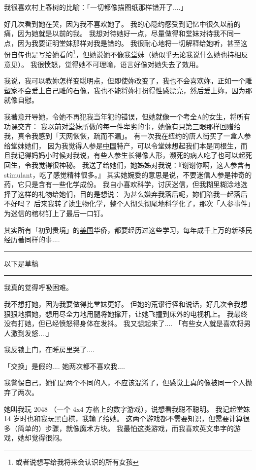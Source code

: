 \documentclass[12pt]{report}
\newcommand*\todo{\begin{center}\color{red}  \rule{5cm}{0.5pt} 以下是草稿\, \rule{5cm}{0.5pt} \end{center}}
\begin{document}
我很喜欢村上春树的比喻：「一切都像描图纸那样错开了....」

好几次看到她在哭，因为我不喜欢她了。  我的心隐约感受到记忆中很久以前的痛，因为她就是以前的我。 我想对待她好一点，尽量做得和堂妹对待我不同一点，因为我要证明堂妹那样对我是错的。 我很耐心地将一切解释给她听，甚至这份自传也是写给她看的\footnote{或者说想写给我将来会认识的所有女孩}，但她说她不像我堂妹（她似乎无论我说什么她也持相反意见）。 我很愤怒，觉得她不可理喻，语言好像对她失去了效用。

我说，我可以教妳怎样变聪明点，但即使妳改变了，我也不会喜欢妳，正如一个雕塑家不会爱上自己雕的石像，我也不能将妳打扮得性感漂亮，然后爱上妳，因为那就像自慰。

我著意开导她，令她不再犯我当年犯的错误，但她就像一个考全A的女生，将所有功课交齐： 我以前对堂妹所做的每一件卑劣的事，她像有只第三眼那样回赠给我，真令我感到「天网恢恢，疏而不漏」。 有一次我在纽约的唐人街买了一盒人参给堂妹她们， 因为我觉得人参是\underline{中国}特产，可以令堂妹想起我们本是同根生，而且我记得妈妈小时候对我说，有些人参生长得像人形，濒死的病人吃了也可以起死回生，令我觉得很神秘。 我送了给她们，她姊姊对我说：『谢谢你啊，这人参含有 stimulant，吃了感觉精神很多。』  其实她婉委的意思是说，不要迷信人参是神奇的药，它只是含有一些化学成份。 我自小喜欢科学，讨厌迷信，但我糊里糊涂地选择了这样的礼物给她们，目的是想说： 为甚么嫌弃我落后呢，妳们陪我一起落后不好吗？ 后来我转了读生物化学，整个人彻头彻尾地科学化了，那次「人参事件」为迷信的棺材钉上了最后一口钉。

其实所有「初到贵境」的\underline{美国}华侨，都要经历过这些学习，每年成千上万的新移民经历著同样的事....

\todo

我真的觉得呼吸困难。

我不想打她，因为我要做得比堂妹更好。  但她的荒谬行径和说话，好几次令我想狠狠地掴她，想用尽全力地用腿将她撑开，让她飞撞到床外的电视机上。  我最终没有打她，但已经愤怒得身体在发抖。  我又想起来了.... 「有些女人就是喜欢将男人激到发怒....」

我反锁上门，在睡房里哭了....

「交换」是假的.... 她两次都不喜欢我....

我警惕自己，她们是两个不同的人，不应该混淆了，但感觉上真的像被同一个人抛弃了两次。

她叫我玩 2048 （一个 4x4 方格上的数字游戏），说想看我聪不聪明。 我记起堂妹 14 岁时也和我玩黑白棋，我输了给她。  这两个游戏都不需要知识，但需要计算很多（简单的）步骤，就像魔术方块。  我最怕这类游戏，而我喜欢英文串字的游戏，她却觉得很闷。
\end{document}
